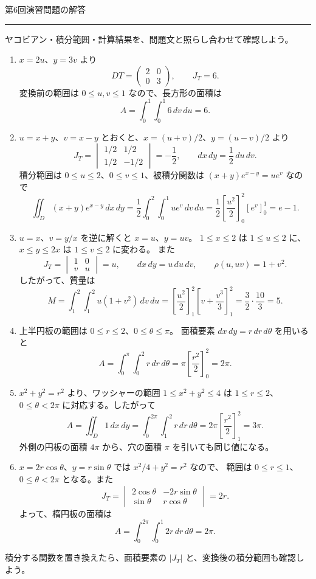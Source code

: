 \documentclass[a4paper,10pt,pdflatex,ja=standard,jafont=ipaex-type1,
  magstyle=real,scale=1]{bxjsarticle}
\newcommand{\handouttitle}[1]{%
  \begin{center}
    {\Large\color{ink}#1}\par\vspace{3mm}
    {\color{accent}\rule{0.88\linewidth}{0.7pt}}
  \end{center}\vspace{-2mm}}
\newcommand{\keybox}[1]{\par\vspace{3pt}\begingroup
  \setlength{\fboxsep}{4pt}%
  \colorbox{soft}{\parbox{\dimexpr\linewidth-2\fboxsep\relax}{\small #1}}%
  \endgroup\par\vspace{2pt}}
\newenvironment{problems}
  {\begin{enumerate}[leftmargin=2em,itemsep=3pt,topsep=3pt,parsep=0pt,
    font=\color{accent}]}
  {\end{enumerate}}
\begin{document}
\newpage
\handouttitle{第6回\quad 演習問題の解答}
{\small ヤコビアン・積分範囲・計算結果を、問題文と照らし合わせて確認しよう。}\par
\begin{problems}
\setlength{\itemsep}{9pt}
\item $x=2u$、$y=3v$ より
$$
 DT=\begin{pmatrix}2&0\\0&3\end{pmatrix},\qquad J_T=6.
$$
変換前の範囲は $0\le u,v\le1$ なので、長方形の面積は
$$A=\int_0^1\int_0^1 6\,dv\,du=6.$$

\item $u=x+y$、$v=x-y$ とおくと、$x=(u+v)/2$、$y=(u-v)/2$ より
$$
 J_T=\begin{vmatrix}1/2&1/2\\1/2&-1/2\end{vmatrix}=-\frac12,\qquad
 dx\,dy=\frac12\,du\,dv.
$$
積分範囲は $0\le u\le2$、$0\le v\le1$、被積分関数は $(x+y)e^{x-y}=ue^v$ なので
$$
 \iint_D(x+y)e^{x-y}\,dx\,dy
 =\frac12\int_0^2\int_0^1 ue^v\,dv\,du
 =\frac12\left[\frac{u^2}{2}\right]_0^2[e^v]_0^1=e-1.
$$

\item $u=x$、$v=y/x$ を逆に解くと $x=u$、$y=uv$。
$1\le x\le2$ は $1\le u\le2$ に、$x\le y\le2x$ は $1\le v\le2$ に変わる。
また
$$
 J_T=\begin{vmatrix}1&0\\v&u\end{vmatrix}=u,\qquad
 dx\,dy=u\,du\,dv,\qquad \rho(u,uv)=1+v^2.
$$
したがって、質量は
$$
 M=\int_1^2\int_1^2 u(1+v^2)\,dv\,du
  =\left[\frac{u^2}{2}\right]_1^2
   \left[v+\frac{v^3}{3}\right]_1^2
  =\frac32\cdot\frac{10}3=5.
$$

\item 上半円板の範囲は $0\le r\le2$、$0\le\theta\le\pi$。
面積要素 $dx\,dy=r\,dr\,d\theta$ を用いると
$$
 A=\int_0^{\pi}\int_0^2 r\,dr\,d\theta
  =\pi\left[\frac{r^2}{2}\right]_0^2=2\pi.
$$

\item $x^2+y^2=r^2$ より、ワッシャーの範囲 $1\le x^2+y^2\le4$ は
$1\le r\le2$、$0\le\theta<2\pi$ に対応する。したがって
$$
 A=\iint_D1\,dx\,dy
  =\int_0^{2\pi}\int_1^2 r\,dr\,d\theta
  =2\pi\left[\frac{r^2}{2}\right]_1^2=3\pi.
$$
外側の円板の面積 $4\pi$ から、穴の面積 $\pi$ を引いても同じ値になる。

\item $x=2r\cos\theta$、$y=r\sin\theta$ では $x^2/4+y^2=r^2$ なので、
範囲は $0\le r\le1$、$0\le\theta<2\pi$ となる。また
$$
 J_T=\begin{vmatrix}2\cos\theta&-2r\sin\theta\\\sin\theta&r\cos\theta\end{vmatrix}=2r.
$$
よって、楕円板の面積は
$$
 A=\int_0^{2\pi}\int_0^1 2r\,dr\,d\theta=2\pi.
$$
\end{problems}
\keybox{積分する関数を置き換えたら、面積要素の $|J_T|$ と、変換後の積分範囲も確認しよう。}
\end{document}
